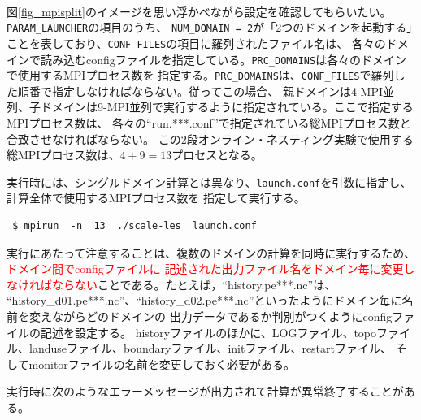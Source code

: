 \\

\noindent 図\ref{fig_mpisplit}のイメージを思い浮かべながら設定を確認してもらいたい。\verb|PARAM_LAUNCHER|の項目のうち、
\verb|NUM_DOMAIN = 2|が「2つのドメインを起動する」ことを表しており、\verb|CONF_FILES|の項目に羅列されたファイル名は、
各々のドメインで読み込むconfigファイルを指定している。\verb|PRC_DOMAINS|は各々のドメインで使用するMPIプロセス数を
指定する。\verb|PRC_DOMAINS|は、\verb|CONF_FILES|で羅列した順番で指定しなければならない。従ってこの場合、
親ドメインは4-MPI並列、子ドメインは9-MPI並列で実行するように指定されている。ここで指定するMPIプロセス数は、
各々の``run.***.conf''で指定されている総MPIプロセス数と合致させなければならない。
この2段オンライン・ネスティング実験で使用する総MPIプロセス数は、$4 + 9 = 13$プロセスとなる。

実行時には、シングルドメイン計算とは異なり、\verb|launch.conf|を引数に指定し、計算全体で使用するMPIプロセス数を
指定して実行する。
\begin{verbatim}
 $ mpirun  -n  13  ./scale-les  launch.conf
\end{verbatim}

実行にあたって注意することは、複数のドメインの計算を同時に実行するため、\textcolor{red}{ドメイン間でconfigファイルに
記述された出力ファイル名をドメイン毎に変更しなければならない}ことである。たとえば，``history.pe***.nc''は、
``history\_d01.pe***.nc''、``history\_d02.pe***.nc''といったようにドメイン毎に名前を変えながらどのドメインの
出力データであるか判別がつくようにconfigファイルの記述を設定する。
historyファイルのほかに、LOGファイル、topoファイル、landuseファイル、boundaryファイル、initファイル、restartファイル、
そしてmonitorファイルの名前を変更しておく必要がある。

実行時に次のようなエラーメッセージが出力されて計算が異常終了することがある。\\

\\

